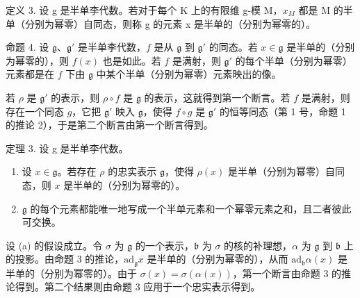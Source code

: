 定义 3. 设 g 是半单李代数。若对于每个 K 上的有限维 g-模 M，\(x_{M}\) 都是 M 的半单（分别为幂零）自同态，则称 g 的元素 x 是半单的（分别为幂零的）。

命题 4. 设 \(\mathfrak{g}\)、\(\mathfrak{g}'\) 是半单李代数，\(f\) 是从 \(\mathfrak{g}\) 到 \(\mathfrak{g}'\) 的同态。若 \(x \in \mathfrak{g}\) 是半单的（分别为幂零的），则 \(f(x)\) 也是如此。若 \(f\) 是满射，则 \(\mathfrak{g}'\) 的每个半单（分别为幂零）元素都是在 \(f\) 下由 \(\mathfrak{g}\) 中某个半单（分别为幂零）元素映出的像。

若 \(\rho\) 是 \(\mathfrak{g}'\) 的表示，则 \(\rho \circ f\) 是 \(\mathfrak{g}\) 的表示，这就得到第一个断言。若 \(f\) 是满射，则存在一个同态 \(g\)，它把 \(\mathfrak{g}'\) 映入 \(\mathfrak{g}\)，使得 \(f \circ g\) 是 \(\mathfrak{g}'\) 的恒等同态（第 1 号，命题 1 的推论 2），于是第二个断言由第一个断言得到。

定理 3. 设 g 是半单李代数。

\begin{enumerate}
\def\labelenumi{(\alph{enumi})}
\item
  设 \(x \in \mathfrak{g}\)。若存在 \(\rho\) 的忠实表示 \(\mathfrak{g}\)，使得 \(\rho(x)\) 是半单（分别为幂零）自同态，则 \(x\) 是半单的（分别为幂零的）。
\item
  \(\mathfrak{g}\) 的每个元素都能唯一地写成一个半单元素和一个幂零元素之和，且二者彼此可交换。
\end{enumerate}

设 (a) 的假设成立。令 \(\sigma\) 为 \(\mathfrak{g}\) 的一个表示，\(\mathfrak{b}\) 为 \(\sigma\) 的核的补理想，\(\alpha\) 为 \(\mathfrak{g}\) 到 \(\mathfrak{b}\) 上的投影。由命题 3 的推论，\(\mathrm{ad}_{\mathfrak{g}}x\) 是半单的（分别为幂零的），从而 \(\mathrm{ad}_{\mathfrak{b}}\alpha(x)\) 是半单的（分别为幂零的）。由于 \(\sigma(x)=\sigma(\alpha(x))\)，第一个断言由命题 3 的推论得到。第二个结果则由命题 3 应用于一个忠实表示得到。

